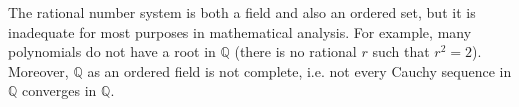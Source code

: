 \documentclass[10pt,varwidth=6in,margin=0.2in,preview]{standalone}
\begin{document}
\begin{flushleft}

The rational number system is both a field and also an ordered set, but it is inadequate for most purposes in mathematical analysis.
For example, many polynomials do not have a root in $\mathbb{Q}$ (there is no rational $r$ such that $r^2 = 2$).
Moreover, $\mathbb{Q}$ as an ordered field is not complete, i.e. not every Cauchy sequence in $\mathbb{Q}$ converges in $\mathbb{Q}$.


\end{flushleft}
\end{document}
